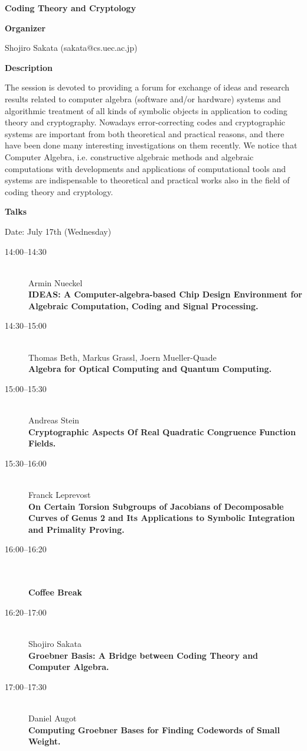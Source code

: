 \begin{center}
{\LARGE \bf Coding Theory and Cryptology }
\end{center}
\bigskip

\noindent
{\bf Organizer}

\medskip

Shojiro Sakata (sakata@cs.uec.ac.jp) 

\bigskip

\noindent
{\bf Description}
\medskip

The session is devoted to providing a forum for exchange of ideas and research results related to
computer algebra (software and/or hardware) systems and algorithmic treatment of all kinds of
symbolic objects in application to coding theory and cryptography. Nowadays error-correcting
codes and cryptographic systems are important from both theoretical and practical reasons, and
there have been done many interesting investigations on them recently. We notice that Computer
Algebra, i.e. constructive algebraic methods and algebraic computations with developments and
applications of computational tools and systems are indispensable to theoretical and practical
works also in the field of coding theory and cryptology. 

\bigskip
\noindent
{\bf Talks}
\medskip

Date: July 17th (Wednesday) 

\begin{description}
\item[14:00--14:30] \ \\
  Armin Nueckel\\
  {\bf IDEAS: A Computer-algebra-based Chip Design Environment for Algebraic
    Computation, Coding and Signal Processing.
    } 
\item[14:30--15:00 ] \ \\
  Thomas Beth, Markus Grassl, Joern Mueller-Quade \\
  {\bf Algebra for Optical Computing and Quantum Computing.} 
\item[15:00--15:30] \ \\
  Andreas Stein\\
  {\bf Cryptographic Aspects Of Real Quadratic Congruence Function Fields.} 
\item[15:30--16:00] \ \\
  Franck Leprevost \\
  {\bf On Certain Torsion Subgroups of Jacobians of Decomposable Curves of Genus 2 and
    Its Applications to Symbolic Integration and Primality Proving.} 
\item[16:00--16:20 ] \ \\
  \\
  {\bf Coffee Break} 
\item[16:20--17:00] \ \\
  Shojiro Sakata\\
  {\bf Groebner Basis: A Bridge between Coding Theory and Computer Algebra.} 
\item[17:00--17:30] \ \\
  Daniel Augot \\
  {\bf Computing Groebner Bases for Finding Codewords of Small Weight.} 
\end{description}

